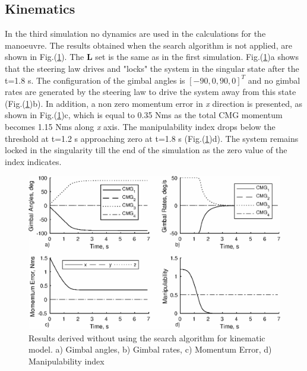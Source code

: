 \documentclass[journal]{new-aiaa}
\begin{document}
\subsection{Kinematics}
In the third simulation no dynamics are used in the calculations for the manoeuvre. The results obtained when the search algorithm is not applied, are shown in Fig.(\ref{fig:kin0}). The $\textbf{L}$ set is the same as in the first simulation.
Fig.(\ref{fig:kin0})a shows that the steering law drives and "locks" the system in the singular state after the t=1.8 s. The configuration of the gimbal angles is $[-90,0,90,0]^T$ and no gimbal rates are generated by the steering law to drive the system away from this state (Fig.(\ref{fig:kin0})b). In addition, a non zero momentum error in \textit{x} direction is presented, as shown in Fig.(\ref{fig:kin0})c, which is equal to 0.35 Nms as the total CMG momentum becomes 1.15 Nms along \textit{x} axis. The manipulability index drops below the threshold at t=1.2 s approaching zero at t=1.8 s (Fig.(\ref{fig:kin0})d). The system remains locked in the singularity till the end of the simulation as the zero value of the index indicates.
\begin{figure}[H]
\centering
\includegraphics[width=6in]{kinwithouttest.eps}
\caption{Results derived without using the search algorithm for kinematic model. a) Gimbal angles, b) Gimbal rates, c) Momentum Error, d) Manipulability index}
\label{fig:kin0}
\end{figure}
\end{document}
